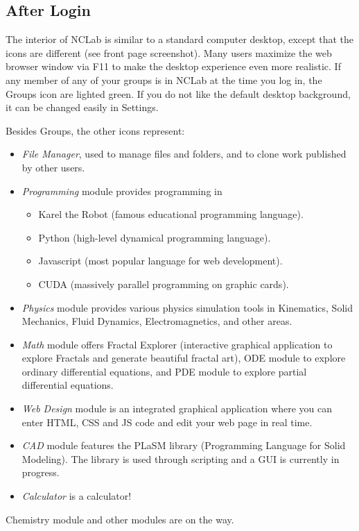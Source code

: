\documentclass{article}
\begin{document}
\subsection{After Login}

The interior of NCLab is similar to a standard computer desktop, except that the 
icons are different (see front page screenshot). Many users maximize the web browser 
window via F11 to make the desktop experience even more realistic.
If any member of any of your groups is in NCLab at the time you log in, the Groups icon 
are lighted green. If you do not like the default desktop background, it can be 
changed easily in Settings.

Besides Groups, the other icons represent:

\begin{itemize}
\item {\em File Manager}, used to manage files and folders, and to clone work published by other users.
\item {\em Programming} module provides programming in 
      \begin{itemize}
      \item Karel the Robot (famous educational programming language). 
      \item Python (high-level dynamical programming language). 
      \item Javascript (most popular language for web development). 
      \item CUDA (massively parallel programming on graphic cards).
      \end{itemize}
\item {\em Physics} module provides various physics simulation tools in Kinematics,
      Solid Mechanics, Fluid Dynamics, Electromagnetics, and other areas. 
\item {\em Math} module offers Fractal Explorer (interactive graphical application 
      to explore Fractals and generate beautiful fractal art), ODE module to explore 
      ordinary differential equations, and PDE module to explore partial differential 
      equations. 
\item {\em Web Design} module is an integrated graphical application where you can 
      enter HTML, CSS and JS code and edit your web page in real time. 
\item {\em CAD} module features the PLaSM library (Programming Language for Solid Modeling).
      The library is used through scripting and a GUI is currently in progress.
\item {\em Calculator} is a calculator! 
\end{itemize}
Chemistry module and other modules are on the way. 
\end{document}
